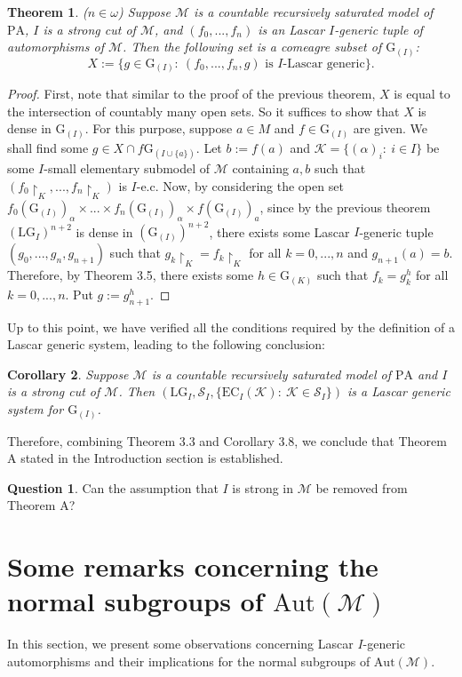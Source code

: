 \documentclass[11pt]{article}
\newtheorem{theorem}{Theorem}[section]
\theoremstyle{plain}
\newtheorem{cor}[theorem]{Corollary}
\theoremstyle{definition}
\newtheorem{q}{Question}
\newcommand{\M}{\mathcal{M}}
\newcommand{\K}{\mathcal{K}}
\newcommand{\G}{\mathrm{G}}
\newcommand{\A}{\mathrm{Aut}}
\newcommand{\pa}{\mathrm{PA}}
\newcommand{\LG}{\mathrm{LG}}
\begin{document}
\begin{theorem}
	($n\in\omega$) 	Suppose $ \M $ is a countable  recursively saturated model of $ \pa $, $I$ is a strong cut of $\M$, and $(f_{0},...,f_{n})$ is an  Lascar $I$-generic tuple of automorphisms of $\M$. Then the following set is a comeagre subset of $\G_{(I)}$:
	$$X:=\{g\in \G_{(I)}: \ (f_{0},...,f_{n},g) \text{ is } I\text{-Lascar generic}\}. $$
\end{theorem}
\begin{proof}
	First, note that similar to the proof of the previous theorem, $X$ is equal to the intersection of countably many open sets. So it suffices to show that $X$ is dense in $\G_{(I)}$. For this purpose,  suppose $a\in M$ and $f\in\G_{(I)}$ are given. We shall find some $g\in X\cap f\G_{(I\cup\{a\})}$. Let $b:=f(a)$ and  $\K=\{(\alpha)_{i}: \ i\in I\}$ be some $I$-small elementary submodel of $\M$ containing $a,b$ such that $(f_{0}\upharpoonright_{K},...,f_{n}\upharpoonright_{K})$ is $I$-e.c. Now, by considering the open set $f_{0}(\G_{(I)})_{\alpha}\times...\times f_{n}(\G_{(I)})_{\alpha}\times f(\G_{(I)})_{a}$,  since by the previous theorem $(\LG_{I})^{n+2}$ is dense in $(\G_{(I)})^{n+2}$, there exists some Lascar $I$-generic tuple $(g_{0},...,g_{n},g_{n+1})$ such that $g_{k}\upharpoonright_{K}=f_{k}\upharpoonright_{K}$ for all $k=0,...,n$ and $g_{n+1}(a)=b$. Therefore, by Theorem 3.5, there exists some $h\in\G_{(K)}$ such that $f_{k}=g_{k}^{h}$ for all $k=0,...,n$. Put $g:=g_{n+1}^{h}$.
\end{proof}
Up to this point, we have verified all the conditions required by the definition of a Lascar generic system, leading to the following conclusion:
\begin{cor}
	Suppose $ \M $ is a countable  recursively saturated model of $ \pa $ and $I$ is a strong cut of $\M$. Then $(\LG_{I},\mathcal{S}_{I},\{\mathrm{EC}_{I}(\K): \ \K\in \mathcal{S}_{I}\})$ is a Lascar generic system for $\G_{(I)}$.
\end{cor}
Therefore, combining Theorem 3.3 and Corollary 3.8, we conclude that Theorem A stated in the Introduction section is established. 
\begin{q}
Can the assumption that 
$I$ is strong in $\M$ be removed from Theorem A?
\end{q}

\section{Some remarks concerning the  normal subgroups of $\A(\M)$}
In this section, we present some observations concerning Lascar $I$-generic automorphisms and their implications for the normal subgroups of $\A(\M)$.
\end{document}
